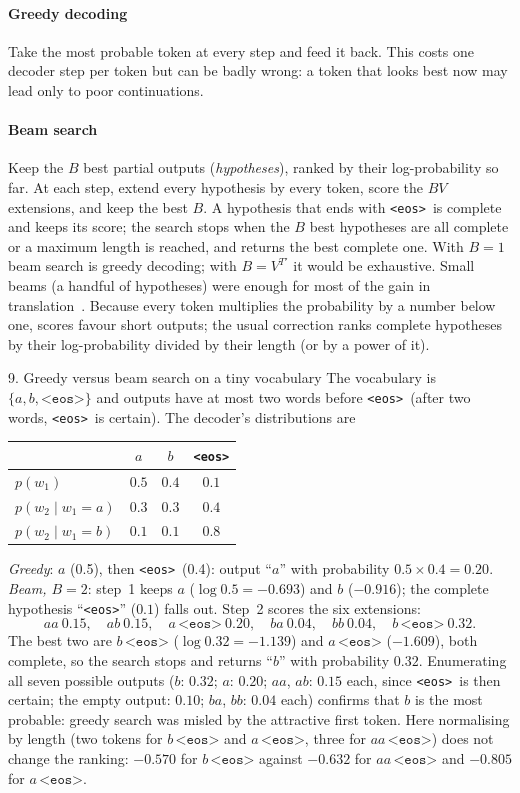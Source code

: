 \documentclass[11pt]{article}
\newcommand{\eos}{\texttt{<eos>}}
\begin{document}
\paragraph{Greedy decoding} Take the most probable token at every step and feed it back. This costs one decoder step per
token but can be badly wrong: a token that looks best now may lead only to poor continuations.

\paragraph{Beam search} Keep the $B$ best partial outputs (\emph{hypotheses}), ranked by their log-probability so far. At
each step, extend every hypothesis by every token, score the $BV$ extensions, and keep the best $B$. A hypothesis that
ends with \eos\ is complete and keeps its score; the search stops when the $B$ best hypotheses are all complete or a
maximum length is reached, and returns the best complete one. With $B = 1$ beam search is greedy decoding; with $B = V^{T'}$
it would be exhaustive. Small beams (a handful of hypotheses) were enough for most of the gain in
translation~\cite{sutskever2014}. Because every token multiplies the probability by a number below one, scores favour
short outputs; the usual correction ranks complete hypotheses by their log-probability divided by their length (or by a
power of it).

\begin{worked}{9. Greedy versus beam search on a tiny vocabulary}
The vocabulary is $\{a, b, \eos\}$ and outputs have at most two words before \eos\ (after two words, \eos\ is certain). The
decoder's distributions are
\begin{center}\small
\begin{tabular}{@{}lccc@{}}
\toprule
 & $a$ & $b$ & \eos \\
\midrule
$p(w_1)$ & $0.5$ & $0.4$ & $0.1$ \\
$p(w_2 \mid w_1 = a)$ & $0.3$ & $0.3$ & $0.4$ \\
$p(w_2 \mid w_1 = b)$ & $0.1$ & $0.1$ & $0.8$ \\
\bottomrule
\end{tabular}
\end{center}
\emph{Greedy}: $a$ (0.5), then \eos\ (0.4): output ``$a$'' with probability $0.5 \times 0.4 = 0.20$.
\emph{Beam, $B = 2$}: step~1 keeps $a$ ($\log 0.5 = -0.693$) and $b$ ($-0.916$); the complete hypothesis ``\eos'' ($0.1$) falls
out. Step~2 scores the six extensions:
\[
  aa\ 0.15,\quad ab\ 0.15,\quad a\,\eos\ 0.20,\quad ba\ 0.04,\quad bb\ 0.04,\quad b\,\eos\ 0.32 .
\]
The best two are $b\,\eos$ ($\log 0.32 = -1.139$) and $a\,\eos$ ($-1.609$), both complete, so the search stops and returns
``$b$'' with probability $0.32$. Enumerating all seven possible outputs ($b$: $0.32$; $a$: $0.20$; $aa$, $ab$: $0.15$ each,
since \eos\ is then certain; the empty output: $0.10$; $ba$, $bb$: $0.04$ each) confirms that $b$ is the most probable: greedy
search was misled by the attractive first token. Here normalising by length (two tokens for $b\,\eos$ and $a\,\eos$, three
for $aa\,\eos$) does not change the ranking: $-0.570$ for $b\,\eos$ against $-0.632$ for $aa\,\eos$ and $-0.805$ for $a\,\eos$.
\end{worked}
\end{document}
